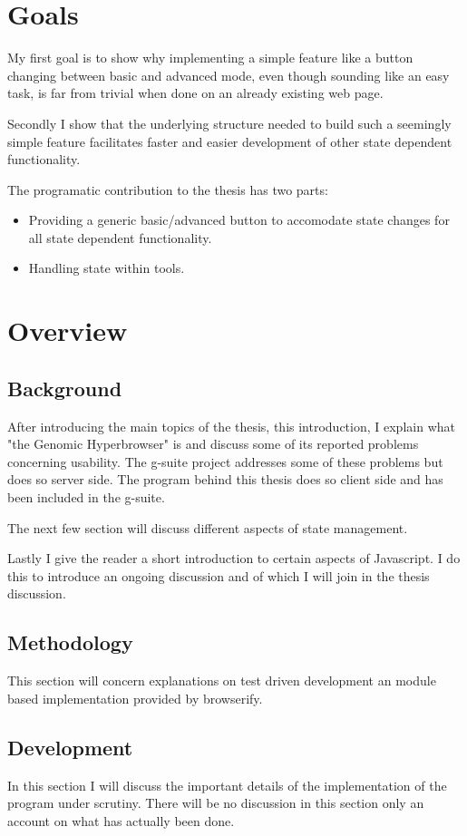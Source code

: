 \documentclass[english]{ifimaster}
\begin{document}
\section{Goals}
My first goal is to show why implementing a simple feature like a button changing between basic and advanced mode, even though sounding like an easy task, is far from trivial when done on an already existing web page. 

Secondly I show that the underlying structure needed to build such a seemingly simple feature facilitates faster and easier development of other state dependent functionality.

The programatic contribution to the thesis has two parts:
\begin{itemize}
  \item Providing a generic basic/advanced button to accomodate state changes for all state dependent functionality.
  \item Handling state within tools. 
\end{itemize}


\section{Overview}
\subsection{Background}
After introducing the main topics of the thesis, this introduction, I explain what "the Genomic Hyperbrowser" is and discuss some of its reported problems concerning usability. The g-suite project addresses some of these problems but does so server side. The program behind this thesis does so client side and has been included in the g-suite.

The next few section will discuss different aspects of state management. 

Lastly I give the reader a short introduction to certain aspects of Javascript. I do this to introduce an ongoing discussion and of which I will join in the thesis discussion.
\subsection{Methodology}
This section will concern explanations on test driven development an module based implementation provided by browserify.
\subsection{Development}
In this section I will discuss the important details of the implementation of the program under scrutiny. There will be no discussion in this section only an account on what has actually been done.
\end{document}
